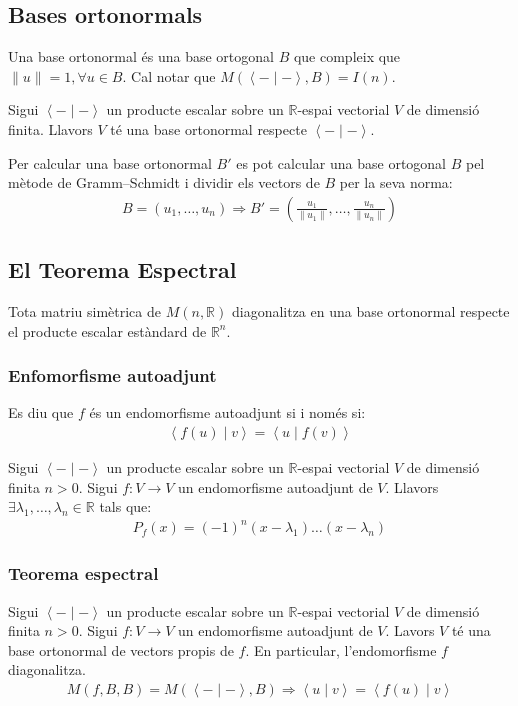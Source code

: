 \subsection{Bases ortonormals}
Una base ortonormal és una base ortogonal $B$ que compleix que $\| u \| = 1, \forall u \in B$. Cal notar que $M(\left< - \mid - \right>, B) = I(n)$.

Sigui $\left< - \mid - \right>$ un producte escalar sobre un $\mathbb{R}$-espai vectorial $V$ de dimensió finita. Llavors $V$ té una base ortonormal respecte $\left< - \mid - \right>$.

Per calcular una base ortonormal $B'$ es pot calcular una base ortogonal $B$ pel mètode de Gramm--Schmidt i dividir els vectors de $B$ per la seva norma:
\begin{align}
    B = ( u_{1}, \dots , u_{n} ) \Rightarrow B' = \left( \frac{u_{1}}{\| u_{1} \|} , \dots , \frac{u_{n}}{\| u_{n} \|} \right)
\end{align}

\subsection{El Teorema Espectral}
Tota matriu simètrica de $M(n,\mathbb{R})$ diagonalitza en una base ortonormal respecte el producte escalar estàndard de $\mathbb{R}^{n}$.

\subsubsection*{Enfomorfisme autoadjunt}
Es diu que $f$ és un endomorfisme autoadjunt si i només si:
\begin{align}
    \left< f(u) \mid v \right> = \left< u \mid f(v) \right>
\end{align}

Sigui $\left< - \mid - \right>$ un producte escalar sobre un $\mathbb{R}$-espai vectorial $V$ de dimensió finita $n>0$. Sigui $f: V \to V$ un endomorfisme autoadjunt de $V$. Llavors $\exists \lambda_{1}, \dots , \lambda_{n} \in \mathbb{R}$ tals que:
\begin{align}
    P_{f}(x) = (-1)^{n} (x - \lambda_{1}) \dots (x - \lambda_{n})
\end{align}

\subsubsection*{Teorema espectral}
Sigui $\left< - \mid - \right>$ un producte escalar sobre un $\mathbb{R}$-espai vectorial $V$ de dimensió finita $n>0$. Sigui $f: V \to V$ un endomorfisme autoadjunt de $V$. Lavors $V$ té una base ortonormal de vectors propis de $f$. En particular, l'endomorfisme $f$ diagonalitza.
\begin{align}
    M(f, B, B) = M (\left< - \mid - \right>, B) \Rightarrow \left< u \mid v \right> = \left< f(u) \mid v \right>
\end{align}

